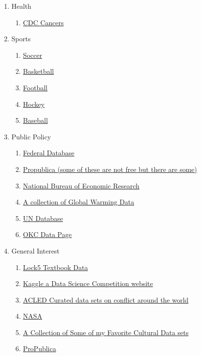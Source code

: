 \documentclass[11pt]{article}
\begin{document}
\begin{enumerate}
\item Health 
\begin{enumerate}
\item \href{https://statecancerprofiles.cancer.gov/quick-profiles/index.php?statename=oklahoma}{CDC Cancers}
\end{enumerate}
\item Sports
\begin{enumerate}
\item \href{https://fbref.com/en/}{Soccer}
\item \href{https://www.basketball-reference.com/}{Basketball}
\item \href{https://www.pro-football-reference.com/}{Football}
\item \href{https://www.hockey-reference.com/}{Hockey}
\item \href{https://www.baseball-reference.com/}{Baseball}
\end{enumerate}
\item Public Policy
\begin{enumerate}
\item \href{https://www.data.gov/}{Federal Database}
\item  \href{https://www.propublica.org/datastore/datasets}{Propublica (some of these are not free but there are some)}
\item \href{https://data.nber.org/data/}{National Bureau of Economic Research}
\item \href{https://lionbridge.ai/datasets/11-best-climate-change-datasets-for-machine-learning/}{A collection of Global Warming Data}
\item \href{http://data.un.org/}{UN Database}
\item \href{https://data.okc.gov/portal/page/start}{OKC Data Page}
\end{enumerate}
\item General Interest
\begin{enumerate}
\item \href{http://www.lock5stat.com/datapage.html}{Lock5 Textbook Data}
\item \href{https://www.kaggle.com/datasets}{Kaggle a Data Science Competition website}
\item \href{https://acleddata.com/curated-data-files/}{ACLED Curated data sets on conflict around the world}
\item \href{https://data.nasa.gov/browse}{NASA}
\item \href{https://github.com/nurfnick/Data_Sets_For_Stats}{A Collection of Some of my Favorite Cultural Data sets}
\item \href{https://www.propublica.org/datastore/datasets/}{ProPublica}


\end{enumerate}
\end{enumerate}
\end{document}
